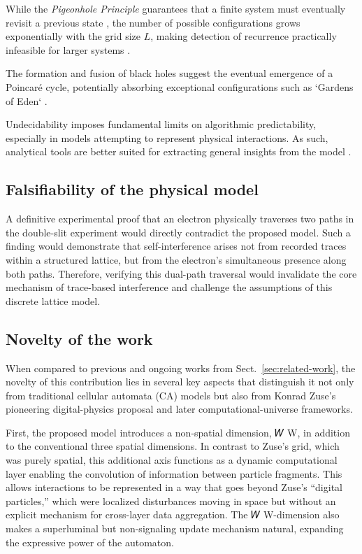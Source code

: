\documentclass[12pt,english]{article}
\begin{document}
While the \textit{Pigeonhole Principle} guarantees that a finite system must eventually revisit a previous state \cite{bernstein2007}, the number of possible configurations grows exponentially with the grid size \( L \), making detection of recurrence practically infeasible for larger systems \cite{toffoli1980}.

The formation and fusion of black holes suggest the eventual emergence of a Poincaré cycle, potentially absorbing exceptional configurations such as `Gardens of Eden` \cite{moore1962}.

Undecidability imposes fundamental limits on algorithmic predictability, especially in models attempting to represent physical interactions. As such, analytical tools are better suited for extracting general insights from the model \cite{wolfram}.

\subsection{Falsifiability of the physical model}

A definitive experimental proof that an electron physically traverses two paths in the double-slit experiment would directly contradict the proposed model. Such a finding would demonstrate that self-interference arises not from recorded traces within a structured lattice, but from the electron's simultaneous presence along both paths. Therefore, verifying this dual-path traversal would invalidate the core mechanism of trace-based interference and challenge the assumptions of this discrete lattice model. 

\subsection{Novelty of the work}

When compared to previous and ongoing works from Sect.~\ref{sec:related-work}, the novelty of this contribution lies in several key aspects that distinguish it not only from traditional cellular automata (CA) models but also from Konrad Zuse’s pioneering digital-physics proposal and later computational-universe frameworks.

First, the proposed model introduces a non-spatial dimension, 
𝑊
W, in addition to the conventional three spatial dimensions. In contrast to Zuse’s grid, which was purely spatial, this additional axis functions as a dynamic computational layer enabling the convolution of information between particle fragments. This allows interactions to be represented in a way that goes beyond Zuse’s “digital particles,” which were localized disturbances moving in space but without an explicit mechanism for cross-layer data aggregation. The 
𝑊
W-dimension also makes a superluminal but non-signaling update mechanism natural, expanding the expressive power of the automaton.
\end{document}
